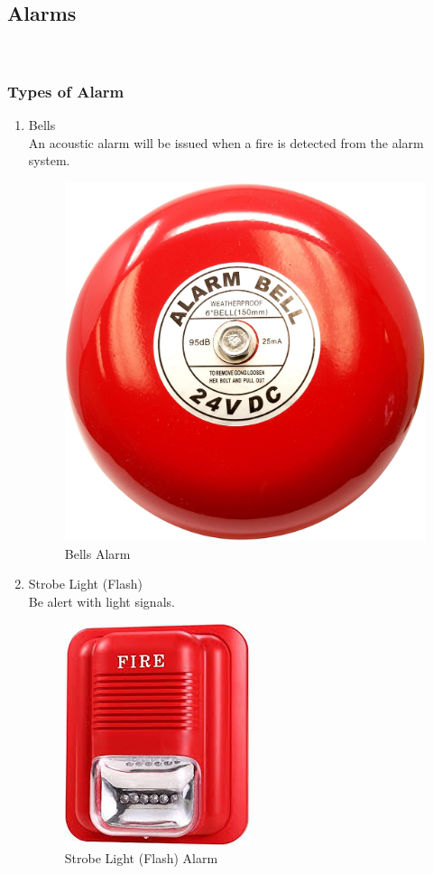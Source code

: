 \documentclass[12pt,fleqn]{book} %
\begin{document}
\begin{enumerate}
\subsection{Alarms}  \\
\subsubsection{Types of Alarm}
\begin{enumerate}
    \item Bells
    \\ An acoustic alarm will be issued when a fire is detected from the alarm system.
\begin{figure}[!h]
    \centering
    \includegraphics[width=0.5\linewidth]{hamdy 35.png}
    \caption{Bells Alarm}
    \label{fig:hamdy 35}
\end{figure}
    \item Strobe Light (Flash)
    \\ Be alert with light signals.
    \begin{figure}[!h]
    \centering
    \includegraphics[width=0.5\linewidth]{hamdy 36.png}
    \caption{Strobe Light (Flash) Alarm}

\end{figure}
\end{enumerate}
\end{enumerate}
\end{document}
